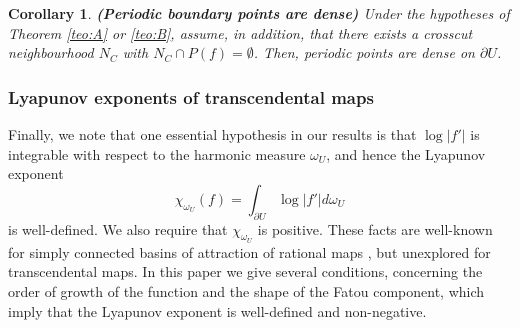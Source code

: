 \documentclass[11pt]{article}
\theoremstyle{definition}
\theoremstyle{remark}
\newcounter{main}
\theoremstyle{plain}
\newtheorem{maincor}[main]{Corollary}
\begin{document}
\begin{maincor}\label{corol:C}{\bf (Periodic boundary points are dense)}
	Under the hypotheses of Theorem \ref{teo:A} or \ref{teo:B}, assume, in addition, that there exists a crosscut neighbourhood $ N_C $ with $ N_C\cap P(f)=\emptyset $. 
	Then, periodic points are dense on $ \partial U $.
\end{maincor}



\subsubsection*{Lyapunov exponents of transcendental maps}
Finally, we note that one essential hypothesis  in our results is that $ \log \left| f'\right|  $ is integrable with respect to the harmonic measure $ \omega_U $, and hence the Lyapunov exponent \[\chi_{\omega_U} (f)=\int_{\partial U}\log \left| f'\right| d\omega_U\] is well-defined. We also require that $  \chi_{\omega_U}$ is positive. These facts are well-known for simply connected basins of attraction of rational maps \cite{Przytycki-Hausdorff_dimension, Przytycki-Lyapunovexponents}, but unexplored for transcendental maps. In this paper we give several conditions, concerning the order of growth of the function and the shape of the Fatou component, which imply that the Lyapunov exponent is well-defined and non-negative.
\end{document}

